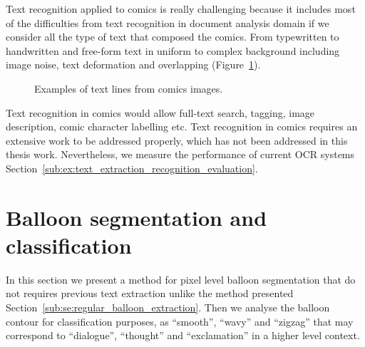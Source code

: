 Text recognition applied to comics is really challenging because it includes most of the difficulties from text recognition in document analysis domain if we consider all the type of text that composed the comics.
From typewritten to handwritten and free-form text in uniform to complex background including image noise, text deformation and overlapping (Figure~\ref{fig:in:texlines_example}).

 \begin{figure}[!ht]  %
   \centering
  \caption[Examples of text lines from comics images]{Examples of text lines from comics images.}
  \label{fig:in:texlines_example}
 \end{figure}

Text recognition in comics would allow full-text search, tagging, image description, comic character labelling etc.
Text recognition in comics requires an extensive work to be addressed properly, which has not been addressed in this thesis work.
Nevertheless, we measure the performance of current OCR systems Section~\ref{sub:ex:text_extraction_recognition_evaluation}.


\section{Balloon segmentation and classification}
\label{sec:in:balloon}

In this section we present a method for pixel level balloon segmentation that do not requires previous text extraction unlike the method presented Section~\ref{sub:se:regular_balloon_extraction}.
Then we analyse the balloon contour for classification purposes, as ``smooth'', ``wavy'' and ``zigzag'' that may correspond to ``dialogue'', ``thought'' and ``exclamation'' in a higher level context.

